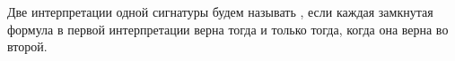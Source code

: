 Две интерпретации одной сигнатуры будем называть , если каждая
замкнутая формула в первой интерпретации верна тогда и только тогда, когда она верна во второй.
